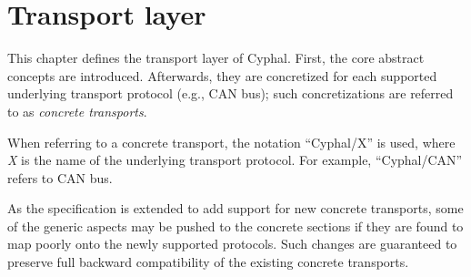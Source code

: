 \chapter{Transport layer}\label{sec:transport}

This chapter defines the transport layer of Cyphal.
First, the core abstract concepts are introduced.
Afterwards, they are concretized for each supported underlying transport protocol (e.g., CAN bus);
such concretizations are referred to as \emph{concrete transports}.

When referring to a concrete transport, the notation ``Cyphal/X'' is used,
where \emph{X} is the name of the underlying transport protocol.
For example, ``Cyphal/CAN'' refers to CAN bus.

As the specification is extended to add support for new concrete transports,
some of the generic aspects may be pushed to the concrete sections
if they are found to map poorly onto the newly supported protocols.
Such changes are guaranteed to preserve full backward compatibility of the existing concrete transports.

\clearpage
\clearpage
\clearpage
